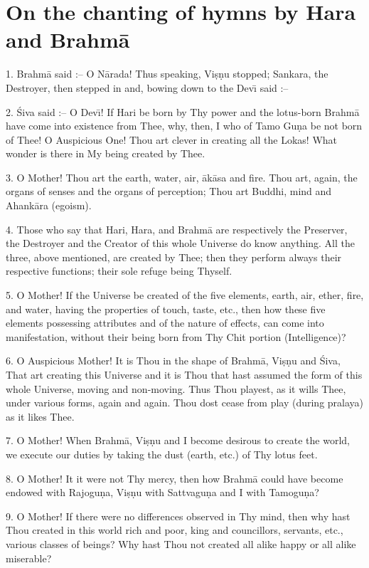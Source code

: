 \chapter{On the chanting of hymns by Hara and Brahm\=a}

1. Brahm\=a said :-- O N\=arada! Thus speaking, Vi\d{s}\d{n}u stopped; Sankara, the Destroyer, then stepped in and, bowing down to the Dev\={\i} said :--

2. \'Siva said :-- O Dev\={\i}! If Hari be born by Thy power and the lotus-born Brahm\=a have come into existence from Thee, why, then, I who of Tamo Gu\d{n}a be not born of Thee! O Auspicious One! Thou art clever in creating all the Lokas! What wonder is there in My being created by Thee.

3. O Mother! Thou art the earth, water, air, \=ak\=asa and fire. Thou art, again, the organs of senses and the organs of perception; Thou art Buddhi, mind and Ahank\=ara (egoism).

4. Those who say that Hari, Hara, and Brahm\=a are respectively the Preserver, the Destroyer and the Creator of this whole Universe do know anything. All the three, above mentioned, are created by Thee; then they perform always their respective functions; their sole refuge being Thyself.

5. O Mother! If the Universe be created of the five elements, earth, air, ether, fire, and water, having the properties of touch, taste, etc., then how these five elements possessing attributes and of the nature of effects, can come into manifestation, without their being born from Thy Chit portion (Intelligence)?

6. O Auspicious Mother! It is Thou in the shape of Brahm\=a, Vi\d{s}\d{n}u and \'Siva, That art creating this Universe and it is Thou that hast assumed the form of this whole Universe, moving and non-moving. Thus Thou playest, as it wills Thee, under various forms, again and again. Thou dost cease from play (during pralaya) as it likes Thee.

7. O Mother! When Brahm\=a, Vi\d{s}\d{n}u and I become desirous to create the world, we execute our duties by taking the dust (earth, etc.) of Thy lotus feet.

8. O Mother! It it were not Thy mercy, then how Brahm\=a could have become endowed with Rajogu\d{n}a, Vi\d{s}\d{n}u with Sattvagu\d{n}a and I with Tamogu\d{n}a?

9. O Mother! If there were no differences observed in Thy mind, then why hast Thou created in this world rich and poor, king and councillors, servants, etc., various classes of beings? Why hast Thou not created all alike happy or all alike miserable?

